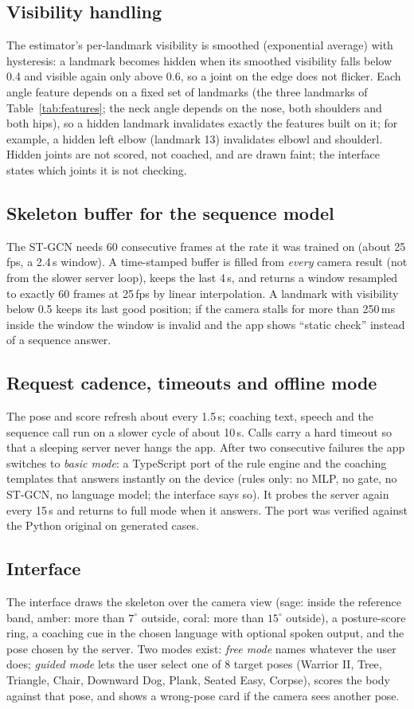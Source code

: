 \documentclass[11pt,a4paper]{article}
\newcommand{\ubrk}{\textunderscore\allowbreak}
\DeclareRobustCommand{\code}[1]{{\ttfamily\small\let\_\ubrk #1}}
\begin{document}
\subsection{Visibility handling}
The estimator's per-landmark visibility is smoothed (exponential average) with hysteresis: a landmark becomes hidden when its smoothed visibility falls below 0.4 and visible again only above 0.6, so a joint on the edge does not flicker. Each angle feature depends on a fixed set of landmarks (the three landmarks of Table~\ref{tab:features}; the neck angle depends on the nose, both shoulders and both hips), so a hidden landmark invalidates exactly the features built on it; for example, a hidden left elbow (landmark 13) invalidates \code{elbow\_l} and \code{shoulder\_l}. Hidden joints are not scored, not coached, and are drawn faint; the interface states which joints it is not checking.

\subsection{Skeleton buffer for the sequence model}
The ST-GCN needs 60 consecutive frames at the rate it was trained on (about 25\,fps, a 2.4\,s window). A time-stamped buffer is filled from \emph{every} camera result (not from the slower server loop), keeps the last 4\,s, and returns a window resampled to exactly 60 frames at 25\,fps by linear interpolation. A landmark with visibility below 0.5 keeps its last good position; if the camera stalls for more than 250\,ms inside the window the window is invalid and the app shows ``static check'' instead of a sequence answer.

\subsection{Request cadence, timeouts and offline mode}
The pose and score refresh about every 1.5\,s; coaching text, speech and the sequence call run on a slower cycle of about 10\,s. Calls carry a hard timeout so that a sleeping server never hangs the app. After two consecutive failures the app switches to \emph{basic mode}: a TypeScript port of the rule engine and the coaching templates that answers instantly on the device (rules only: no MLP, no gate, no ST-GCN, no language model; the interface says so). It probes the server again every 15\,s and returns to full mode when it answers. The port was verified against the Python original on generated cases.

\subsection{Interface}
The interface draws the skeleton over the camera view (sage: inside the reference band, amber: more than $7^\circ$ outside, coral: more than $15^\circ$ outside), a posture-score ring, a coaching cue in the chosen language with optional spoken output, and the pose chosen by the server. Two modes exist: \emph{free mode} names whatever the user does; \emph{guided mode} lets the user select one of 8 target poses (Warrior II, Tree, Triangle, Chair, Downward Dog, Plank, Seated Easy, Corpse), scores the body against that pose, and shows a wrong-pose card if the camera sees another pose.
\end{document}
